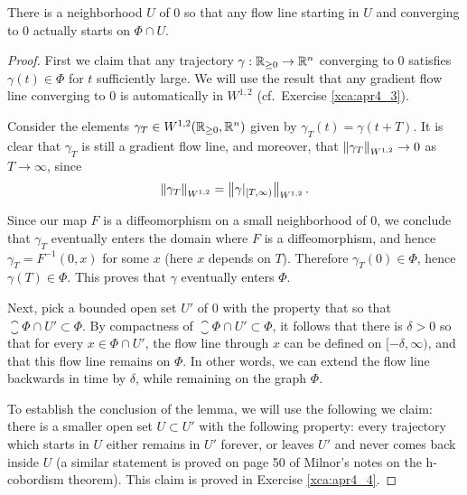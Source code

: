 \documentclass{amsart}
\begin{document}
\begin{lemma}\label{lemma:apr4_5}
  There is a neighborhood $U$ of $0$ so that any flow line starting in $U$ and converging to $0$ actually starts on $\Phi\cap U$.
\end{lemma}
\begin{proof}
  First we claim that any trajectory $\gamma:\mathbb{R}_{\ge 0}\to \mathbb{R}^{n}$ converging to $0$ satisfies $\gamma(t)\in \Phi$ for $t$ sufficiently large. We will use the result that any gradient flow line converging to $0$ is automatically in $W^{1,2}$ (cf.\ Exercise \ref{xca:apr4_3}).

  Consider the elements $\gamma_{T}\in W^{1,2}(\mathbb{R}_{\ge 0},\mathbb{R}^{n})$ given by $\gamma_{T}(t)=\gamma(t+T)$. It is clear that $\gamma_{T}$ is still a gradient flow line, and moreover, that $\left\lVert\gamma_{T}\right\rVert_{W^{1,2}}\to 0$ as $T\to\infty$, since
  \begin{equation*}
    \left\lVert\gamma_{T}\right\rVert_{W^{1,2}}=\left\lVert\gamma|_{[T,\infty)}\right\rVert_{W^{1,2}}.
  \end{equation*}

  Since our map $F$ is a diffeomorphism on a small neighborhood of $0$, we conclude that $\gamma_{T}$ eventually enters the domain where $F$ is a diffeomorphism, and hence $\gamma_{T}=F^{-1}(0,x)$ for some $x$ (here $x$ depends on $T$). Therefore $\gamma_{T}(0)\in \Phi$, hence $\gamma(T)\in \Phi$. This proves that $\gamma$ eventually enters $\Phi$.

  Next, pick a bounded open set $U'$ of $0$ with the property that so that $\closure{\Phi \cap U'}\subset \Phi$. By compactness of $\closure{\Phi\cap U'}\subset \Phi$, it follows that there is $\delta>0$ so that for every $x\in \Phi\cap U'$, the flow line through $x$ can be defined on $[-\delta,\infty)$, and that this flow line remains on $\Phi$. In other words, we can extend the flow line backwards in time by $\delta$, while remaining on the graph $\Phi$.
  
  To establish the conclusion of the lemma, we will use the following we claim: there is a smaller open set $U\subset U'$ with the following property: every trajectory which starts in $U$ either remains in $U'$ forever, or leaves $U'$ and never comes back inside $U$ (a similar statement is proved on page 50 of Milnor's notes on the h-cobordism theorem). This claim is proved in Exercise \ref{xca:apr4_4}.


\end{proof}
\end{document}
